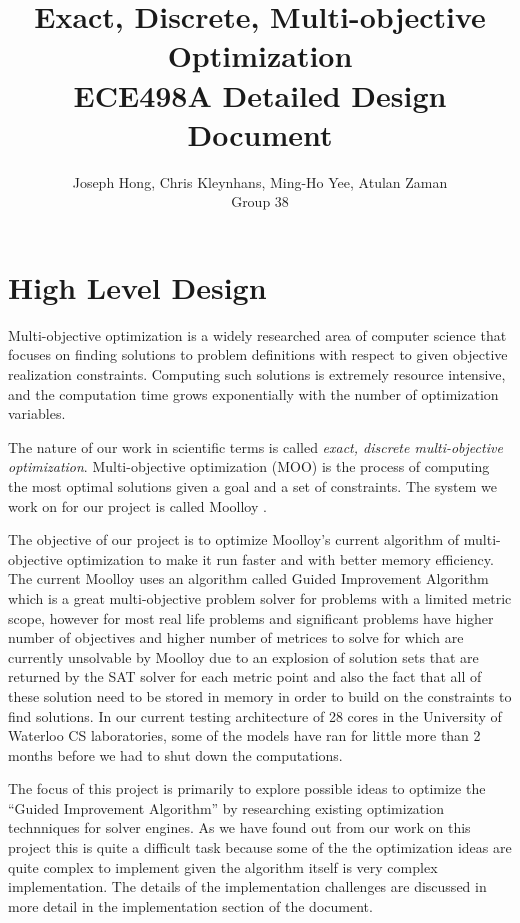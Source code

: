 \documentclass[11pt]{article}
\title{{\Large Exact, Discrete, Multi-objective Optimization} \\ ECE498A Detailed Design Document}
\author{Joseph Hong, Chris Kleynhans, Ming-Ho Yee, Atulan Zaman \\
          Group 38}
\theoremstyle{definition}
\begin{document}
\maketitle
{}

\newpage
\tableofcontents

\listoffigures

\newpage


\section{High Level Design}\label{sec:high_level}
Multi-objective optimization is a widely researched area of computer
science that focuses on finding solutions to problem definitions with
respect to given objective realization constraints. Computing such
solutions is extremely resource intensive, and the computation time
grows exponentially with the number of optimization variables.

The nature of our work in scientific terms is called \textit{exact,
discrete multi-objective optimization}. Multi-objective optimization
(MOO) is the process of computing the most optimal solutions given a
goal and a set of constraints. The system we work on for our project is called Moolloy \cite{ref:Rayside09}.

The objective of our project is to optimize Moolloy's current algorithm of multi-objective optimization to make it run faster and with better memory efficiency. The current Moolloy uses an algorithm called Guided Improvement Algorithm which is a great multi-objective problem solver for problems with a limited metric scope, however for most real life problems and significant problems have higher number of objectives and higher number of metrices to solve for which are currently unsolvable by Moolloy due to an explosion of solution sets that are returned by the SAT solver for each metric point and also the fact that all of these solution need to be stored in memory in order to build on the constraints to find solutions. In our current testing architecture of 28 cores in the University of Waterloo CS laboratories, some of the models have ran for little more than 2 months before we had to shut down the computations.

The focus of this project is primarily to explore possible ideas to optimize the ``Guided Improvement Algorithm'' by researching existing optimization technniques for solver engines. As we have found out from our work on this project this is quite a difficult task because some of the the optimization ideas are quite complex to implement given the algorithm itself is very complex implementation. The details of the implementation challenges are discussed in more detail in the implementation section of the document.
\end{document}
